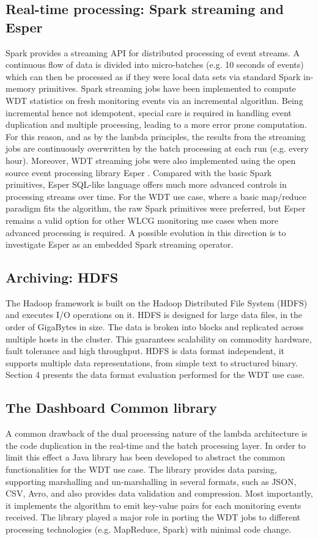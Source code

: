 \subsection{Real-time processing: Spark streaming and Esper} 

Spark provides a streaming API for distributed processing of event streams.  A
continuous flow of data is divided into micro-batches (e.g. 10 seconds of events)
which can then be processed as if they were local data sets via standard Spark
in-memory primitives. Spark streaming jobs have been implemented to compute WDT
statistics on fresh monitoring events via an incremental algorithm.  Being
incremental hence not idempotent, special care is required in handling event
duplication and multiple processing, leading to a more error prone computation.
For this reason, and as by the lambda principles, the results from the
streaming jobs are continuously overwritten by the batch processing at each run
(e.g. every hour). Moreover, WDT streaming jobs were also implemented using
the open source event processing library Esper \cite{esper}. Compared with the basic Spark
primitives, Esper SQL-like language offers much more advanced controls in
processing streams over time.  For the WDT use case, where a basic map/reduce
paradigm fits the algorithm, the raw Spark primitives were preferred, but Esper
remains a valid option for other WLCG monitoring use cases when more advanced
processing is required. A possible evolution in this direction is to
investigate Esper as an embedded Spark streaming operator.
 

\subsection{Archiving: HDFS} 

The Hadoop framework is built on the Hadoop Distributed File System (HDFS) and
executes I/O operations on it. HDFS is designed for large data files, in the
order of GigaBytes in size. The data is broken into blocks and replicated
across multiple hosts in the cluster. This guarantees scalability on commodity
hardware, fault tolerance and high throughput. HDFS is data format independent,
it supports multiple data representations, from simple text to structured
binary. Section 4 presents the data format evaluation performed for the WDT use
case.

\subsection{The Dashboard Common library}
A common drawback of the dual processing nature of the lambda architecture is the
code duplication in the real-time and the batch processing layer. In order to
limit this effect a Java library has been developed to abstract the
common functionalities for the WDT use case. The library provides data parsing,
supporting marshalling and un-marshalling in several formats, such as JSON, CSV,
Avro, and also provides data validation and compression. Most importantly, it implements
the algorithm to emit key-value pairs for each monitoring events received. The
library played a major role in porting the WDT jobs to different processing
technologies (e.g. MapReduce, Spark) with minimal code change.

